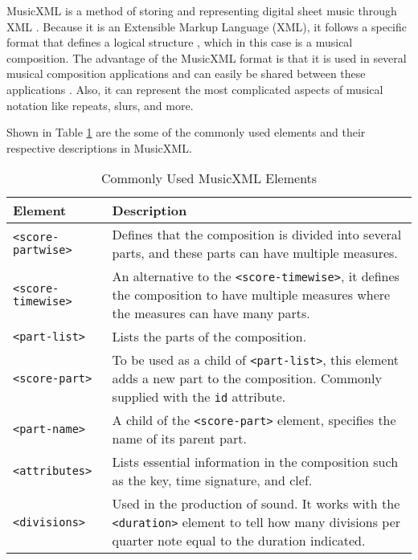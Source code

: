 MusicXML is a method of storing and representing digital sheet music through XML \citep{makemusic2017musicxml}. Because it is an Extensible Markup Language (XML), it follows a specific format that defines a logical structure \citep{bray1997extensible}, which in this case is a musical composition. The advantage of the MusicXML format is that it is used in several musical composition applications and can easily be shared between these applications \citep{makemusic2017musicxml}. Also, it can represent the most complicated aspects of musical notation like repeats, slurs, and more.

Shown in Table \ref{tab:musicxml} are the some of the commonly used elements and their respective descriptions in MusicXML.
 
\begin{longtable}{|p{3.6cm}|p{10cm}|} 
\caption{Commonly Used MusicXML Elements} \label{tab:musicxml} \\
\hline
       
       Element & Description \\ \hline
		
        \texttt{<score-partwise>} & Defines that the composition is divided into several parts, and these parts can have multiple measures. \\ \hline
        
        \texttt{<score-timewise>} & An alternative to the \texttt{<score-timewise>}, it defines the composition to have multiple measures where the measures can have many parts. \\ \hline

		\texttt{<part-list>} & Lists the parts of the composition. \\ \hline
        
        \texttt{<score-part>} & To be used as a child of \texttt{<part-list>}, this element adds a new part to the composition. Commonly supplied with the \texttt{id} attribute. \\ \hline
        
        \texttt{<part-name>} & A child of the \texttt{<score-part>} element, specifies the name of its parent part. \\ \hline
        
        \texttt{<attributes>} & Lists essential information in the composition such as the key, time signature, and clef. \\ \hline
        
        \texttt{<divisions>} &  Used in the production of sound. It works with the \texttt{<duration>} element to tell how many divisions per quarter note equal to the duration indicated. \\ \hline
        

\end{longtable}
